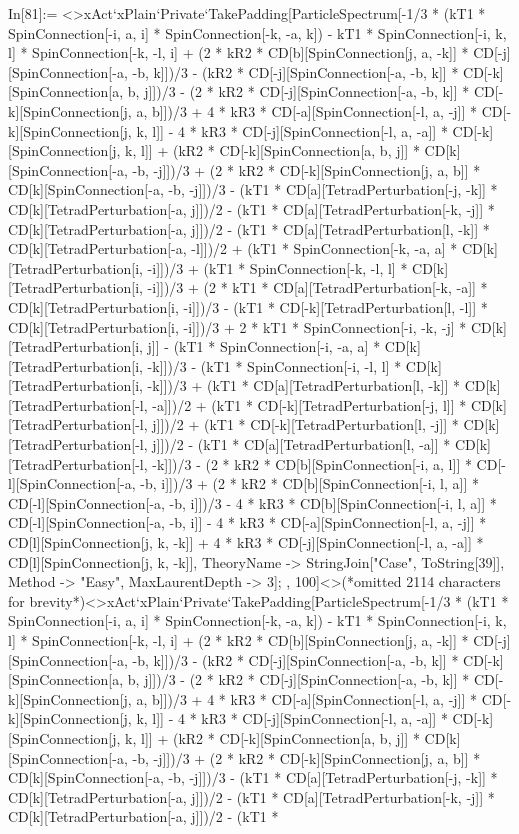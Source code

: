 In[81]:= <>xAct`xPlain`Private`TakePadding[ParticleSpectrum[-1/3 * (kT1 * SpinConnection[-i, a, i] * SpinConnection[-k, -a, k]) - kT1 * SpinConnection[-i, k, l] * SpinConnection[-k, -l, i] + (2 * kR2 * CD[b][SpinConnection[j, a, -k]] * CD[-j][SpinConnection[-a, -b, k]])/3 - (kR2 * CD[-j][SpinConnection[-a, -b, k]] * CD[-k][SpinConnection[a, b, j]])/3 - (2 * kR2 * CD[-j][SpinConnection[-a, -b, k]] * CD[-k][SpinConnection[j, a, b]])/3 + 4 * kR3 * CD[-a][SpinConnection[-l, a, -j]] * CD[-k][SpinConnection[j, k, l]] - 4 * kR3 * CD[-j][SpinConnection[-l, a, -a]] * CD[-k][SpinConnection[j, k, l]] + (kR2 * CD[-k][SpinConnection[a, b, j]] * CD[k][SpinConnection[-a, -b, -j]])/3 + (2 * kR2 * CD[-k][SpinConnection[j, a, b]] * CD[k][SpinConnection[-a, -b, -j]])/3 - (kT1 * CD[a][TetradPerturbation[-j, -k]] * CD[k][TetradPerturbation[-a, j]])/2 - (kT1 * CD[a][TetradPerturbation[-k, -j]] * CD[k][TetradPerturbation[-a, j]])/2 - (kT1 * CD[a][TetradPerturbation[l, -k]] * CD[k][TetradPerturbation[-a, -l]])/2 + (kT1 * SpinConnection[-k, -a, a] * CD[k][TetradPerturbation[i, -i]])/3 + (kT1 * SpinConnection[-k, -l, l] * CD[k][TetradPerturbation[i, -i]])/3 + (2 * kT1 * CD[a][TetradPerturbation[-k, -a]] * CD[k][TetradPerturbation[i, -i]])/3 - (kT1 * CD[-k][TetradPerturbation[l, -l]] * CD[k][TetradPerturbation[i, -i]])/3 + 2 * kT1 * SpinConnection[-i, -k, -j] * CD[k][TetradPerturbation[i, j]] - (kT1 * SpinConnection[-i, -a, a] * CD[k][TetradPerturbation[i, -k]])/3 - (kT1 * SpinConnection[-i, -l, l] * CD[k][TetradPerturbation[i, -k]])/3 + (kT1 * CD[a][TetradPerturbation[l, -k]] * CD[k][TetradPerturbation[-l, -a]])/2 + (kT1 * CD[-k][TetradPerturbation[-j, l]] * CD[k][TetradPerturbation[-l, j]])/2 + (kT1 * CD[-k][TetradPerturbation[l, -j]] * CD[k][TetradPerturbation[-l, j]])/2 - (kT1 * CD[a][TetradPerturbation[l, -a]] * CD[k][TetradPerturbation[-l, -k]])/3 - (2 * kR2 * CD[b][SpinConnection[-i, a, l]] * CD[-l][SpinConnection[-a, -b, i]])/3 + (2 * kR2 * CD[b][SpinConnection[-i, l, a]] * CD[-l][SpinConnection[-a, -b, i]])/3 - 4 * kR3 * CD[b][SpinConnection[-i, l, a]] * CD[-l][SpinConnection[-a, -b, i]] - 4 * kR3 * CD[-a][SpinConnection[-l, a, -j]] * CD[l][SpinConnection[j, k, -k]] + 4 * kR3 * CD[-j][SpinConnection[-l, a, -a]] * CD[l][SpinConnection[j, k, -k]], TheoryName -> StringJoin["Case", ToString[39]], Method -> "Easy", MaxLaurentDepth -> 3]; , 100]<>(*omitted 2114 characters for brevity*)<>xAct`xPlain`Private`TakePadding[ParticleSpectrum[-1/3 * (kT1 * SpinConnection[-i, a, i] * SpinConnection[-k, -a, k]) - kT1 * SpinConnection[-i, k, l] * SpinConnection[-k, -l, i] + (2 * kR2 * CD[b][SpinConnection[j, a, -k]] * CD[-j][SpinConnection[-a, -b, k]])/3 - (kR2 * CD[-j][SpinConnection[-a, -b, k]] * CD[-k][SpinConnection[a, b, j]])/3 - (2 * kR2 * CD[-j][SpinConnection[-a, -b, k]] * CD[-k][SpinConnection[j, a, b]])/3 + 4 * kR3 * CD[-a][SpinConnection[-l, a, -j]] * CD[-k][SpinConnection[j, k, l]] - 4 * kR3 * CD[-j][SpinConnection[-l, a, -a]] * CD[-k][SpinConnection[j, k, l]] + (kR2 * CD[-k][SpinConnection[a, b, j]] * CD[k][SpinConnection[-a, -b, -j]])/3 + (2 * kR2 * CD[-k][SpinConnection[j, a, b]] * CD[k][SpinConnection[-a, -b, -j]])/3 - (kT1 * CD[a][TetradPerturbation[-j, -k]] * CD[k][TetradPerturbation[-a, j]])/2 - (kT1 * CD[a][TetradPerturbation[-k, -j]] * CD[k][TetradPerturbation[-a, j]])/2 - (kT1 * 